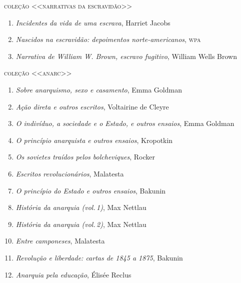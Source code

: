 \medskip
{\large\textsc{coleção <<narrativas da escravidão>>}}

\begin{enumerate}
\setlength\parskip{4.2pt}
\setlength\itemsep{-1.4mm}
\item \textit{Incidentes da vida de uma escrava}, Harriet Jacobs
\item \textit{Nascidos na escravidão: depoimentos norte-americanos}, \textsc{wpa}
\item \textit{Narrativa de William W. Brown, escravo fugitivo}, William Wells Brown
\end{enumerate}

\medskip
{\large\textsc{coleção <<anarc>>}}

\begin{enumerate}
\setlength\parskip{4.2pt}
\setlength\itemsep{-1.4mm}
\item \textit{Sobre anarquismo, sexo e casamento}, Emma Goldman
\item \textit{Ação direta e outros escritos}, Voltairine de Cleyre
\item \textit{O indivíduo, a sociedade e o Estado, e outros ensaios}, Emma Goldman
\item \textit{O princípio anarquista e outros ensaios}, Kropotkin
\item \textit{Os sovietes traídos pelos bolcheviques}, Rocker
\item \textit{Escritos revolucionários}, Malatesta
\item \textit{O princípio do Estado e outros ensaios}, Bakunin
\item \textit{História da anarquia (vol.\,1)}, Max Nettlau
\item \textit{História da anarquia (vol.\,2)}, Max Nettlau
\item \textit{Entre camponeses}, Malatesta
\item \textit{Revolução e liberdade: cartas de 1845 a 1875}, Bakunin
\item \textit{Anarquia pela educação}, Élisée Reclus 
\end{enumerate}

\pagebreak